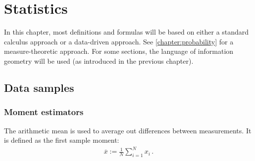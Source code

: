 \chapter{Statistics}\label{chapter:statistics}

    In this chapter, most definitions and formulas will be based on either a standard calculus approach or a data-driven approach. See \cref{chapter:probability} for a measure-theoretic approach. For some sections, the language of information geometry will be used (as introduced in the previous chapter).

\section{Data samples}
\subsection{Moment estimators}

    \begin{example}\label{statistics:arithmetic_mean}
        The arithmetic mean is used to average out differences between measurements. It is defined as the first sample moment:
        \begin{gather}
            \overline{x} := \frac{1}{N}\sum_{i=1}^Nx_i\,.
        \end{gather}
    \end{example}

